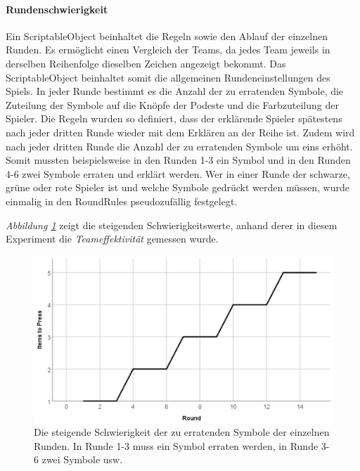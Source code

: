 \documentclass[a4paper,11pt]{article}%
\renewcommand{\\}{\vspace*{0.5\baselineskip} \newline}
\begin{document}
{\paragraph{Rundenschwierigkeit}
Ein ScriptableObject beinhaltet die Regeln sowie den Ablauf der einzelnen Runden. Es ermöglicht einen Vergleich der Teams, da jedes Team jeweils in derselben Reihenfolge dieselben Zeichen angezeigt bekommt. Das ScriptableObject beinhaltet somit die allgemeinen Rundeneinstellungen des Spiels. In jeder Runde bestimmt es die Anzahl der zu erratenden Symbole, die Zuteilung der Symbole auf die Knöpfe der Podeste und die Farbzuteilung der Spieler. Die Regeln wurden so definiert, dass der erklärende Spieler spätestens nach jeder dritten Runde wieder mit dem Erklären an der Reihe ist. Zudem wird nach jeder dritten Runde die Anzahl der zu erratenden Symbole um eins erhöht. Somit mussten beispielsweise in den Runden 1-3 ein Symbol und in den Runden 4-6 zwei Symbole erraten und erklärt werden. Wer in einer Runde der schwarze, grüne oder rote Spieler ist und welche Symbole gedrückt werden müssen, wurde einmalig in den RoundRules pseudozufällig festgelegt.

{\textit{Abbildung \ref{RoundDifficulty}} zeigt die steigenden Schwierigkeitswerte, anhand derer in diesem Experiment die \textit{Teameffektivität} gemessen wurde.

\begin{figure}[H]
		\begin{footnotesize}
		\centering
			\includegraphics[scale=0.4]{Abbildungen/RoundDifficulty.JPG}	
			\caption[Der Schwierigkeitsgrad der Runden]{Die steigende Schwierigkeit der zu erratenden Symbole der einzelnen Runden. In Runde 1-3 muss ein Symbol erraten werden, in Runde 3-6 zwei Symbole usw.}
			\label{RoundDifficulty}
		\end{footnotesize}
	\end{figure}

}}
\end{document}

